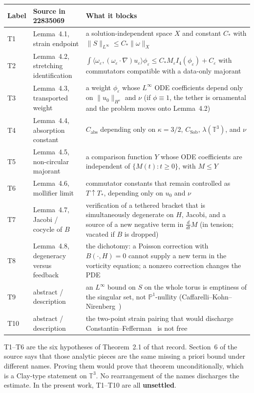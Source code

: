 \documentclass[11pt,a4paper]{article}
\theoremstyle{definition}
\theoremstyle{remark}
\newcommand{\T}{\mathbb{T}}
\newcommand{\Hs}{H^{s}}
\begin{document}
{\small
\noindent
\begin{tabularx}{\linewidth}{@{}>{\raggedright\arraybackslash}p{0.7in}>{\raggedright\arraybackslash}p{1.6in}X@{}}
\toprule
Label & Source in 22835069 & What it blocks \\
\midrule
T1 & Lemma~4.1, strain endpoint & a solution-independent space $X$ and constant $C_{\ast}$ with $\|S\|_{L^\infty}\le C_{\ast}\|\omega\|_{X}$ \\
T2 & Lemma~4.2, stretching identification & $\int\langle\omega_{\varepsilon},(\omega_{\varepsilon}\cdot\nabla)u_{\varepsilon}\rangle\phi_{\varepsilon}\le C_{\ast}M_{\varepsilon}I_{4}(\phi_{\varepsilon})+C_{\varepsilon}$ with commutators compatible with a data-only majorant \\
T3 & Lemma~4.3, transported weight & a weight $\phi_{\varepsilon}$ whose $L^\infty$ ODE coefficients depend only on $\|u_0\|_{\Hs}$ and $\nu$ (if $\phi\equiv 1$, the tether is ornamental and the problem moves onto Lemma~4.2) \\
T4 & Lemma~4.4, absorption constant & $C_{\mathrm{abs}}$ depending only on $\kappa=3/2$, $C_{\mathrm{Sob}}$, $\lambda(\T^3)$, and $\nu$ \\
T5 & Lemma~4.5, non-circular majorant & a comparison function $Y$ whose ODE coefficients are independent of $\{M(t):t\ge 0\}$, with $M\le Y$ \\
T6 & Lemma~4.6, mollifier limit & commutator constants that remain controlled as $T\uparrow T_{\ast}$, depending only on $u_0$ and $\nu$ \\
T7 & Lemma~4.7, Jacobi / cocycle of $B$ & verification of a tethered bracket that is simultaneously degenerate on $H$, Jacobi, and a source of a new negative term in $\frac{d}{dt}M$ (in tension; vacated if $B$ is dropped) \\
T8 & Lemma~4.8, degeneracy versus feedback & the dichotomy: a Poisson correction with $B(\cdot,H)=0$ cannot supply a new term in the vorticity equation; a nonzero correction changes the PDE \\
T9 & abstract / description & an $L^\infty$ bound on $S$ on the whole torus is emptiness of the singular set, not $\mathbb{P}^{1}$-nullity (Caffarelli--Kohn--Nirenberg~\cite{CKN}) \\
T10 & abstract / description & the two-point strain pairing that would discharge Constantin--Fefferman~\cite{CF} is not free \\
\bottomrule
\end{tabularx}
}

T1--T6 are the six hypotheses of Theorem~2.1 of that record. Section~6 of the source says that those analytic pieces are the same missing a priori bound under different names. Proving them would prove that theorem unconditionally, which is a Clay-type statement on $\T^3$. No rearrangement of the names discharges the estimate. In the present work, T1--T10 are all \textbf{unsettled}.
\end{document}

